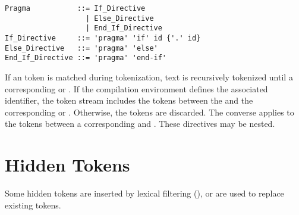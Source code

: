 \syntax\begin{lstlisting}
Pragma           ::= If_Directive 
                   | Else_Directive 
                   | End_If_Directive 
If_Directive     ::= 'pragma' 'if' id {'.' id}
Else_Directive   ::= 'pragma' 'else'
End_If_Directive ::= 'pragma' 'end-if'
\end{lstlisting}

If an  token is matched during tokenization, text is recursively tokenized until a corresponding  or . If the compilation environment defines the associated identifier, the token stream includes the tokens between the  and the corresponding  or . Otherwise, the tokens are discarded. The converse applies to the tokens between a corresponding  and . These directives may be nested. 





\section{Hidden Tokens}
\label{sec:hidden-tokens}

Some hidden tokens are inserted by lexical filtering (), or are used to replace existing tokens. 





